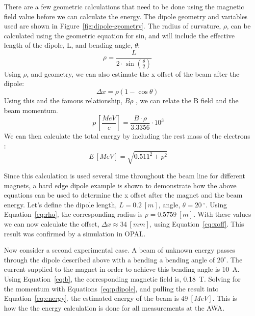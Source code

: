 There are a few geometric calculations that need to be done using the magnetic field value
before we can calculate the energy. The dipole geometry and variables used are shown in Figure~\ref{fig:dipole-geometry}.
The radius of curvature, $\rho$, can be calculated using the geometric equation for sin, and 
will include the effective length of the dipole, L, and bending angle, $\theta$:
\begin{equation}
	\rho = \frac{L}{2\cdot \sin(\frac{\theta}{2})}
\end{equation}\label{eq:rho}
Using $\rho$, and geometry, we can also estimate the x offset of the
beam after the dipole: 
\begin{equation}
	\Delta x = \rho \left( 1- \cos\theta \right)
\end{equation}\label{eq:xoff}
Using this and the famous relationship, $B\rho$ \cite{Wiedemann},
we can relate the B field and the beam momentum. 
\begin{equation}
	\SI{}{p\,\left[\frac{MeV}{c}\right]} = \frac{B\cdot \rho}{3.3356}\cdot 10^3
	\label{eq:pdipole}
\end{equation}
We can then calculate the total energy by including the rest mass of the electrons \cite{Griffiths}:
\begin{equation}
	\SI{}{E\,[MeV]} = \sqrt{0.511^2+p^2}
	\label{eq:energy}
\end{equation}

Since this calculation is used several time throughout the 
beam line for different magnets, a hard edge dipole example is shown 
to demonstrate how the above equations can be used to determine
the x offset after the magnet and the beam energy. 
Let's define the dipole length, $L=\SI{0.2}{[m]}$, angle, $\theta=\SI{20}{^\circ}$. 
Using Equation~\ref{eq:rho}, 
the corresponding radius is $\rho = \SI{0.5759}{[m]}$. 
With these values we can now calculate the offset, $\Delta x \approx \SI{34}{[mm]}$, 
using Equation~\ref{eq:xoff}. This result was confirmed by a simulation in OPAL. 

Now consider a second experimental case.
A beam of unknown energy passes through the dipole described above
with a bending a bending angle of $20^\circ$. 
The current supplied to the magnet in order to achieve this bending angle is \SI{10}{A}.
Using Equation~\ref{eq:b}, the corresponding magnetic field is, \SI{0.18}{T}.
Solving for the momentum with Equations~\ref{eq:pdipole}, and pulling the 
result into Equation~\ref{eq:energy}, 
the estimated energy of the beam is $\SI{49}{[MeV]}$.
This is how the the energy calculation is done for all measurements at the AWA.


